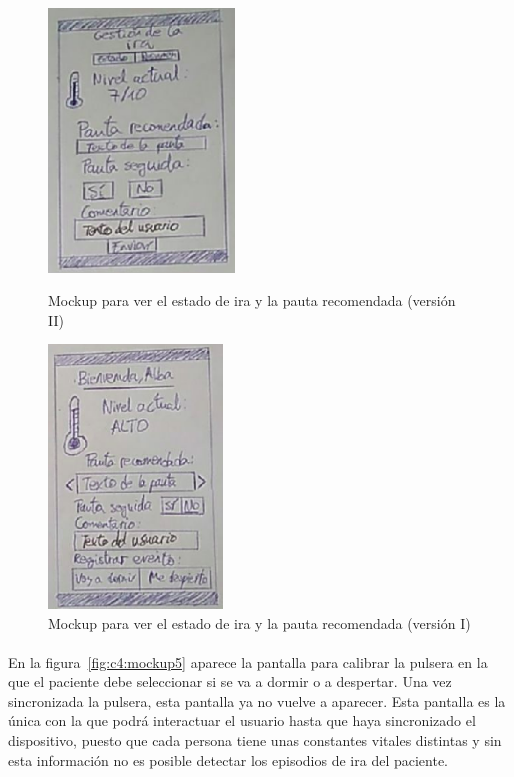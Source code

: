 \begin{figure}[h]
    \centering
    \begin{minipage}{.4\textwidth}
        \centering
        \includegraphics[width=0.8\linewidth, height=7cm]{Imagenes/anxA1-2.png}
        \caption[Mockup para ver el estado de ira y la pauta recomendada (versión II)]{Mockup para ver el estado de ira y la pauta recomendada (versión II)}
        \label{fig:c4:mockup3}
    \end{minipage}
    \hfill\vline\hfill
    \begin{minipage}{.4\textwidth}
        \centering
        \includegraphics[width=0.8\linewidth, height=7cm]{Imagenes/anxA1-4.png}
        \caption[Mockup para ver el estado de ira y la pauta recomendada (versión I)]{Mockup para ver el estado de ira y la pauta recomendada (versión I)}
        \label{fig:c4:mockup4}
    \end{minipage}%
\end{figure}

\paragraph{}
En la figura~\ref{fig:c4:mockup5} aparece la pantalla para calibrar la pulsera en la que el paciente debe seleccionar si se va a dormir o a despertar. Una vez sincronizada la pulsera, esta pantalla ya no vuelve a aparecer. Esta pantalla es la única con la que podrá interactuar el usuario hasta que haya sincronizado el dispositivo, puesto que cada persona tiene unas constantes vitales distintas y sin esta información no es posible detectar los episodios de ira del paciente.

